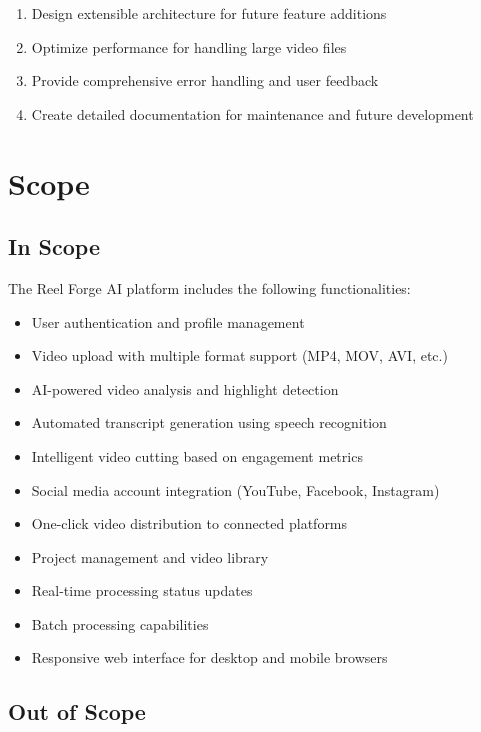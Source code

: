 \begin{enumerate}
    \item Design extensible architecture for future feature additions
    \item Optimize performance for handling large video files
    \item Provide comprehensive error handling and user feedback
    \item Create detailed documentation for maintenance and future development
\end{enumerate}

\section{Scope}

\subsection{In Scope}

The Reel Forge AI platform includes the following functionalities:

\begin{itemize}
    \item User authentication and profile management
    \item Video upload with multiple format support (MP4, MOV, AVI, etc.)
    \item AI-powered video analysis and highlight detection
    \item Automated transcript generation using speech recognition
    \item Intelligent video cutting based on engagement metrics
    \item Social media account integration (YouTube, Facebook, Instagram)
    \item One-click video distribution to connected platforms
    \item Project management and video library
    \item Real-time processing status updates
    \item Batch processing capabilities
    \item Responsive web interface for desktop and mobile browsers
\end{itemize}

\subsection{Out of Scope}

